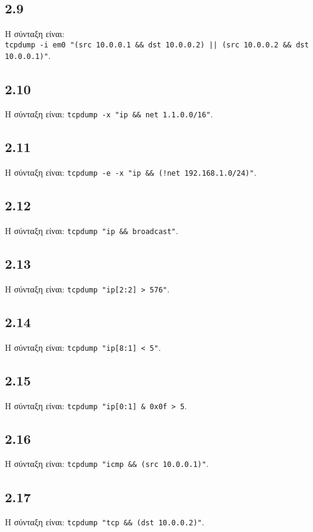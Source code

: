 \documentclass[a4paper, 12pt]{article}
\begin{document}
	\subsection*{2.9}
		Η σύνταξη είναι: \\
		\verb+tcpdump -i em0 "(src 10.0.0.1 && dst 10.0.0.2) || (src 10.0.0.2 && dst 10.0.0.1)"+.

	\subsection*{2.10}
		Η σύνταξη είναι: \verb|tcpdump -x "ip && net 1.1.0.0/16"|.

	\subsection*{2.11}
		Η σύνταξη είναι: \verb|tcpdump -e -x "ip && (!net 192.168.1.0/24)"|.

	\subsection*{2.12}
		Η σύνταξη είναι: \verb|tcpdump "ip && broadcast"|.

	\subsection*{2.13}
		Η σύνταξη είναι: \verb|tcpdump "ip[2:2] > 576"|.

	\subsection*{2.14}
		Η σύνταξη είναι: \verb|tcpdump "ip[8:1] < 5"|.

	\subsection*{2.15}
		Η σύνταξη είναι: \verb|tcpdump "ip[0:1] & 0x0f > 5|.

	\subsection*{2.16}
		Η σύνταξη είναι: \verb|tcpdump "icmp && (src 10.0.0.1)"|.

	\subsection*{2.17}
		Η σύνταξη είναι: \verb|tcpdump "tcp && (dst 10.0.0.2)"|.
\end{document}
